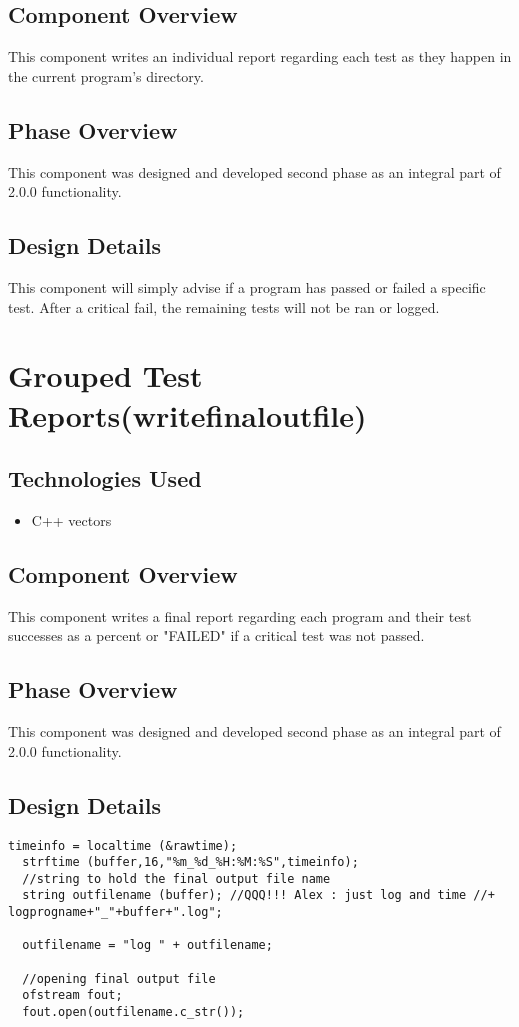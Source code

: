 \subsection{Component  Overview}
This component writes an individual report regarding each test as they happen in the current program's directory.

\subsection{Phase Overview}
This component was designed and developed second phase as an integral part of 2.0.0 functionality.

\subsection{Design Details}
This component will simply advise if a program has passed or failed a specific test.  After a critical fail, the remaining tests will not be ran or logged.


\section{Grouped Test Reports(writefinaloutfile)}

\subsection{Technologies  Used}
\begin{itemize}
\item C++ vectors
\end{itemize}

\subsection{Component  Overview}
This component writes a final report regarding each program and their test successes as a percent or "FAILED" if a critical test was not passed.

\subsection{Phase Overview}
This component was designed and developed second phase as an integral part of 2.0.0 functionality.

\subsection{Design Details}
\begin{lstlisting}
timeinfo = localtime (&rawtime);
  strftime (buffer,16,"%m_%d_%H:%M:%S",timeinfo);
  //string to hold the final output file name
  string outfilename (buffer); //QQQ!!! Alex : just log and time //+ logprogname+"_"+buffer+".log";

  outfilename = "log " + outfilename;

  //opening final output file
  ofstream fout;
  fout.open(outfilename.c_str());
\end{lstlisting}

